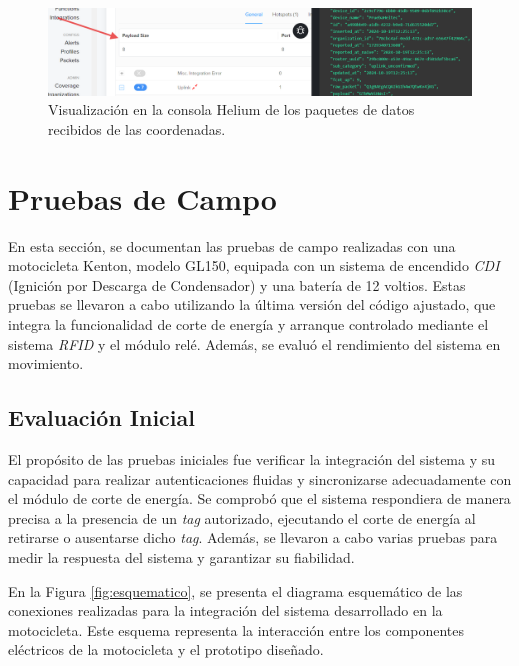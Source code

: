 \begin{figure}[H]
\leavevmode
\begin{minipage}{\textwidth}
\begin{center}
\includegraphics[width=\textwidth]{./capitulo_05/imagen/coord.png}
\caption{Visualización en la  consola Helium de los paquetes de datos recibidos de las coordenadas.\label{fig:cord}}
\end{center}
\end{minipage}
\end{figure}



\section{Pruebas de Campo}

En esta sección, se documentan las pruebas de campo realizadas con una motocicleta Kenton, modelo GL150, equipada con un sistema de encendido \textit{CDI} (Ignición por Descarga de Condensador) y una batería de 12 voltios. Estas pruebas se llevaron a cabo utilizando la última versión del código ajustado, que integra la funcionalidad de corte de energía y arranque controlado mediante el sistema \textit{RFID} y el módulo relé. Además, se evaluó el rendimiento del sistema en movimiento.

\subsection{Evaluación Inicial}

El propósito de las pruebas iniciales fue verificar la integración del sistema y su capacidad para realizar autenticaciones fluidas y sincronizarse adecuadamente con el módulo de corte de energía. Se comprobó que el sistema respondiera de manera precisa a la presencia de un \textit{tag} autorizado, ejecutando el corte de energía al retirarse o ausentarse dicho \textit{tag}. Además, se llevaron a cabo varias pruebas para medir la respuesta del sistema y garantizar su fiabilidad.

En la Figura \ref{fig:esquematico}, se presenta el diagrama esquemático de las conexiones realizadas para la integración del sistema desarrollado en la motocicleta. Este esquema representa la interacción entre los componentes eléctricos de la motocicleta y el prototipo diseñado.

